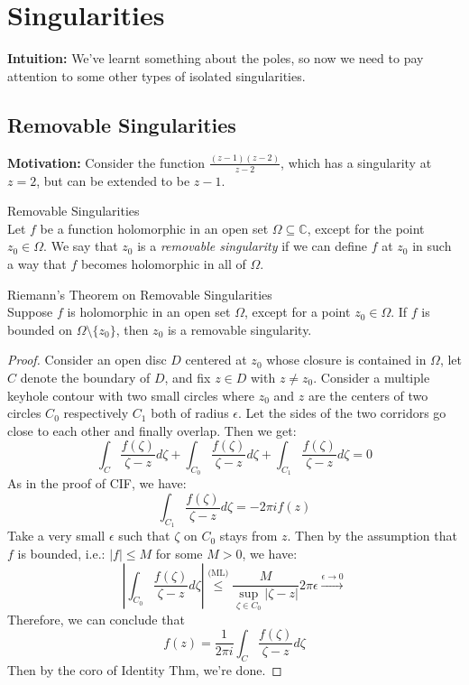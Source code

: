 \section{Singularities}

\noindent\textbf{Intuition:} We've learnt something  about the poles, so now we need to pay attention to some other types of isolated singularities.

\subsection{Removable Singularities}

\noindent\textbf{Motivation:} Consider the function $\frac{(z-1)(z-2)}{z-2}$, which has a singularity at $z=2$, but can be extended to be $z-1$.

\begin{definition}{Removable Singularities}\\
Let $f$ be a function holomorphic in an open set $\Omega \subseteq \mathbb{C}$, except for the point $z_0 \in \Omega$. We say that $z_0$ is a \textit{removable singularity} if we can define $f$ at $z_0$ in such a way that $f$ becomes holomorphic in all of $\Omega$.
\end{definition}

\begin{theorem}{Riemann's Theorem on Removable Singularities}\\
Suppose $f$ is holomorphic in an open set $\Omega$, except for a point $z_0 \in \Omega$. If $f$ is bounded on $\Omega \setminus \{z_0\}$, then $z_0$ is a removable singularity.
\end{theorem}

\begin{proof}
    Consider an open disc $D$ centered at $z_0$ whose closure is contained in $\Omega$, let $C$ denote the boundary of $D$, and fix $z\in D$ with $z\neq z_0$. Consider a multiple keyhole contour with two small circles where $z_0$ and $z$ are the centers of two circles $C_0$ respectively $C_1$ both of radius $\epsilon$. Let the sides of the two corridors go close to each other and finally overlap. Then we get:
    \[
    \int_C \frac{f(\zeta)}{\zeta -z}d\zeta +\int_{C_0} \frac{f(\zeta)}{\zeta -z}d\zeta + \int_{C_1} \frac{f(\zeta)}{\zeta -z}d\zeta=0
    \]
    As in the proof of CIF, we have:
    \[
    \int_{C_1} \frac{f(\zeta)}{\zeta -z}d\zeta=-2\pi if(z)
    \]
    Take a very small $\epsilon$ such that $\zeta$ on $C_0$ stays from $z$. Then by the assumption that $f$ is bounded, i.e.: $|f|\leq M$ for some $M>0$, we have:
    \[
    |\int_{C_0} \frac{f(\zeta)}{\zeta -z}d\zeta| \overset{(\text{ML)}}{\leq} \frac{M}{\sup_{\zeta \in C_0} |\zeta -z|} 2\pi \epsilon \xrightarrow{\epsilon\to0}
    \]
    Therefore, we can conclude that
    \[
    f(z)= \frac{1}{2\pi i} \int_{C} \frac{f(\zeta)}{\zeta -z}d\zeta
    \]
    Then by the coro of Identity Thm, we're done.
\end{proof}

